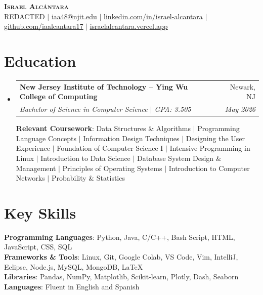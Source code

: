 \documentclass[letterpaper,11pt]{article}
\makeatletter
\newcommand{\resumeSubheading}[4]{
  \vspace{-2pt}\item
    \begin{tabular*}{0.97\textwidth}[t]{l@{\extracolsep{\fill}}r}
      \textbf{#1} & #2 \\
      \textit{\small#3} & \textit{\small #4} \\
    \end{tabular*}\vspace{-7pt}
}
\newcommand{\resumeSubHeadingListStart}{\begin{itemize}[leftmargin=0.15in, label={}]}
\newcommand{\resumeSubHeadingListEnd}{\end{itemize}}
\makeatother
\begin{document}
\begin{center}
    \textbf{\Huge \scshape Israel Alcántara} \\ \vspace{1pt}
    \small REDACTED $|$ 
    \href{mailto:iaa48@njit.edu}{\underline{iaa48@njit.edu}} $|$ 
    \href{https://linkedin.com/in/israel-alcantara}{\underline{linkedin.com/in/israel-alcantara}} $|$
    \href{https://github.com/iaalcantara17}{\underline{github.com/iaalcantara17}} $|$
    \href{https://israelalcantara.vercel.app/}{\underline{israelalcantara.vercel.app}}
\end{center}

\section{Education}
  \resumeSubHeadingListStart
    \resumeSubheading
      {New Jersey Institute of Technology – Ying Wu College of Computing}{Newark, NJ}
      {Bachelor of Science in Computer Science $|$ GPA: 3.505}{May 2026}
      \begin{flushleft}
        \small \textbf{Relevant Coursework}: Data Structures \& Algorithms $|$ Programming Language Concepts $|$ Information Design Techniques $|$ Designing the User Experience $|$ Foundation of Computer Science I $|$ Intensive Programming in Linux $|$ Introduction to Data Science $|$ Database System Design \& Management $|$ Principles of Operating Systems $|$ Introduction to Computer Networks $|$ Probability \& Statistics
      \end{flushleft}
  \resumeSubHeadingListEnd

\section{Key Skills}
\begin{itemize}[leftmargin=0.15in, label={}]
    \small{\item{
      \textbf{Programming Languages}{: Python, Java, C/C++, Bash Script, HTML, JavaScript, CSS, SQL} \\
      \textbf{Frameworks \& Tools}{: Linux, Git, Google Colab, VS Code, Vim, IntelliJ, Eclipse, Node.js, MySQL, MongoDB, LaTeX} \\
      \textbf{Libraries}{: Pandas, NumPy, Matplotlib, Scikit-learn, Plotly, Dash, Seaborn} \\
      \textbf{Languages}{: Fluent in English and Spanish} \\
    }}
\end{itemize}
\end{document}
